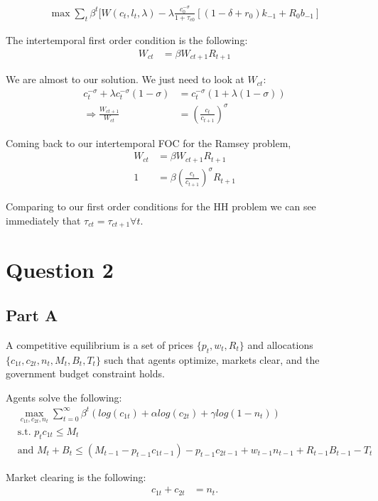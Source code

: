 \documentclass[11pt]{article} %
\begin{document}
\begin{align*}
\max \sum_t \beta^t[W(c_t,l_t,\lambda) - \lambda \frac{c_0^{-\sigma}}{1+\tau_{c0}}[(1-\delta+r_0)k_{-1} + R_{0}b_{-1}]
\end{align*}

The intertemporal first order condition is the following:
\begin{align*}
W_{ct} &= \beta W_{ct+1} R_{t+1}
\end{align*}

We are almost to our solution. We just need to look at $W_{ct}$:
\begin{align*}
c_t^{-\sigma} +\lambda c_t^{-\sigma}(1-\sigma) &= c_t^{-\sigma}(1+\lambda(1-\sigma))\\
\Rightarrow \frac{W_{ct+1}}{W_{ct}} &= \left(\frac{c_t}{c_{t+1}}\right)^{\sigma}
\end{align*}

Coming back to our intertemporal FOC for the Ramsey problem,
\begin{align*}
W_{ct} &= \beta W_{ct+1} R_{t+1} \\
1  &=\beta\left(\frac{c_t}{c_{t+1}}\right)^{\sigma}R_{t+1}
\end{align*}

Comparing to our first order conditions for the HH problem we can see immediately that $\tau_{ct} = \tau_{ct+1} \forall t$.
\section{Question 2}
\subsection{Part A}
A competitive equilibrium is a set of prices $\{ p_t,w_t,R_t \}$ and allocations $\{ c_{1t},c_{2t},n_t,M_t,B_t,T_t \}$ such that agents optimize, markets clear, and the government budget constraint holds.

Agents solve the following:
\begin{align*}
&\max_{c_{1t},c_{2t},n_t}\sum_{t=0}^{\infty}\beta^t( log(c_{1t}) + \alpha log(c_{2t}) + \gamma log(1-n_t))\\
&\text{s.t. } p_{t}c_{1t} \leq M_t\\
&\text{and }M_t + B_t \leq (M_{t-1} - p_{t-1}c_{1t-1}) - p_{t-1}c_{2t-1} + w_{t-1}n_{t-1}  + R_{t-1}B_{t-1} - T_{t}
\end{align*}

Market clearing is the following:
\begin{align*}
c_{1t} + c_{2t} &= n_t.
\end{align*}
\end{document}
